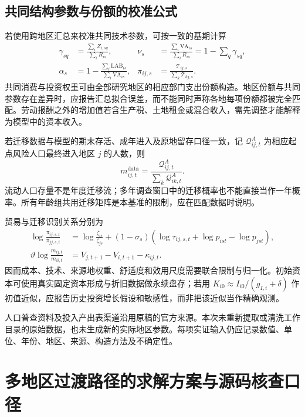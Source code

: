 \documentclass[UTF8,a4paper,zihao=-4,fontset=windows]{ctexart}
\numberwithin{equation}{section}
\begin{document}
\subsection{共同结构参数与份额的校准公式}
若使用跨地区汇总来校准共同技术参数，可按一致的基期计算
\begin{align}
 \gamma_{sq}&=\frac{\sum_iZ_{i,sq}}{\sum_iR_{is}},&
 \nu_s&=\frac{\sum_i\mathrm{VA}_{is}}{\sum_iR_{is}}
 =1-\sum_q\gamma_{sq},\\
 \alpha_s&=1-\frac{\sum_i\mathrm{LAB}_{is}}{\sum_i\mathrm{VA}_{is}},&
 \pi_{ij,s}&=\frac{\mathcal T_{ij,s}}{\sum_k\mathcal T_{kj,s}}.
 \label{eq:lg-calibration-technology}
\end{align}
共同消费与投资权重可由全部研究地区的相应部门支出份额构造。地区份额与共同参数存在差异时，应报告汇总拟合误差，而不能同时声称各地每项份额都被完全匹配。劳动报酬之外的增加值若含生产税、土地租金或混合收入，需先调整才能解释为模型中的资本收入。

若迁移数据与模型的期末存活、成年进入及原地留存口径一致，记 $\mathcal Q^A_{ij,t}$ 为相应起点风险人口最终进入地区 $j$ 的人数，则
\begin{equation}
 m_{ij,t}^{\mathrm{data}}=\frac{\mathcal Q^A_{ij,t}}{\sum_k\mathcal Q^A_{ik,t}}.
\end{equation}
流动人口存量不是年度迁移流；多年调查窗口中的迁移概率也不能直接当作一年概率。所有年龄组共用迁移矩阵是本基准的限制，应在匹配数据时说明。

贸易与迁移识别关系分别为
\begin{align}
 \log\frac{\pi_{ij,s,t}}{\pi_{jj,s,t}}
 &=\log\frac{\zeta_{is}}{\zeta_{js}}
 +(1-\sigma_s)\left(\log\tau_{ij,s,t}+\log p_{ist}-\log p_{jst}\right),\\
 \vartheta\log\frac{m_{ij,t}}{m_{ii,t}}
 &=V_{j,t+1}-V_{i,t+1}-\kappa_{ij,t}.
\end{align}
因而成本、技术、来源地权重、舒适度和效用尺度需要联合限制与归一化。初始资本可使用真实固定资本形成与折旧数据做永续盘存；若用 $K_{i0}\approx I_{i0}/(g_{I,i}+\delta)$ 作初值近似，应报告历史投资增长假设和敏感性，而非把该近似当作精确观测。

人口普查资料及投入产出表渠道沿用原稿的官方来源\citep{nbs2020census,nbs2024io}。本次未重新提取或清洗工作目录的原始数据，也未生成新的实际地区参数。每项实证输入仍应记录数值、单位、年份、地区、来源、构造方法及不确定性。

\section{多地区过渡路径的求解方案与源码核查口径}
\label{sec:lg-solution}
\end{document}
